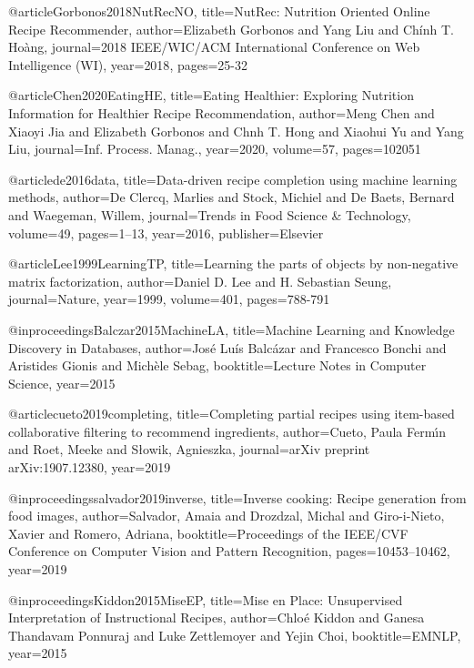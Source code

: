 @article{Gorbonos2018NutRecNO,
  title={NutRec: Nutrition Oriented Online Recipe Recommender},
  author={Elizabeth Gorbonos and Yang Liu and Ch{\'i}nh T. Ho{\`a}ng},
  journal={2018 IEEE/WIC/ACM International Conference on Web Intelligence (WI)},
  year={2018},
  pages={25-32}
}

@article{Chen2020EatingHE,
  title={Eating Healthier: Exploring Nutrition Information for Healthier Recipe Recommendation},
  author={Meng Chen and Xiaoyi Jia and Elizabeth Gorbonos and Chnh T. Hong and Xiaohui Yu and Yang Liu},
  journal={Inf. Process. Manag.},
  year={2020},
  volume={57},
  pages={102051}
}


@article{de2016data,
  title={Data-driven recipe completion using machine learning methods},
  author={De Clercq, Marlies and Stock, Michiel and De Baets, Bernard and Waegeman, Willem},
  journal={Trends in Food Science \& Technology},
  volume={49},
  pages={1--13},
  year={2016},
  publisher={Elsevier}
}


@article{Lee1999LearningTP,
  title={Learning the parts of objects by non-negative matrix factorization},
  author={Daniel D. Lee and H. Sebastian Seung},
  journal={Nature},
  year={1999},
  volume={401},
  pages={788-791}
}

@inproceedings{Balczar2015MachineLA,
  title={Machine Learning and Knowledge Discovery in Databases},
  author={Jos{\'e} Lu{\'i}s Balc{\'a}zar and Francesco Bonchi and Aristides Gionis and Mich{\`e}le Sebag},
  booktitle={Lecture Notes in Computer Science},
  year={2015}
}


@article{cueto2019completing,
  title={Completing partial recipes using item-based collaborative filtering to recommend ingredients},
  author={Cueto, Paula Ferm{\'\i}n and Roet, Meeke and S{\l}owik, Agnieszka},
  journal={arXiv preprint arXiv:1907.12380},
  year={2019}
}




@inproceedings{salvador2019inverse,
  title={Inverse cooking: Recipe generation from food images},
  author={Salvador, Amaia and Drozdzal, Michal and Giro-i-Nieto, Xavier and Romero, Adriana},
  booktitle={Proceedings of the IEEE/CVF Conference on Computer Vision and Pattern Recognition},
  pages={10453--10462},
  year={2019}
}


@inproceedings{Kiddon2015MiseEP,
  title={Mise en Place: Unsupervised Interpretation of Instructional Recipes},
  author={Chlo{\'e} Kiddon and Ganesa Thandavam Ponnuraj and Luke Zettlemoyer and Yejin Choi},
  booktitle={EMNLP},
  year={2015}
}

